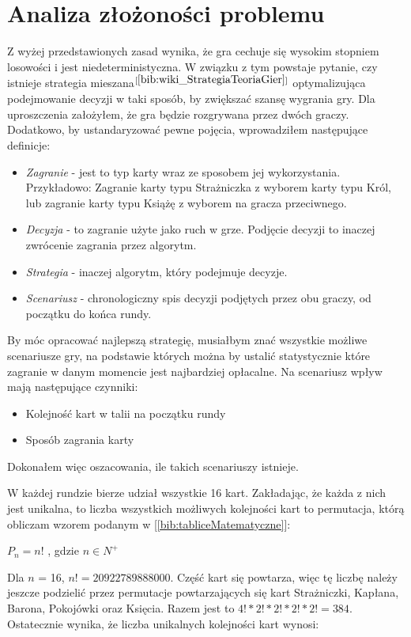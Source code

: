 \section{Analiza złożoności problemu}
\label{sec:opisProblemu}
Z wyżej przedstawionych zasad wynika, że gra cechuje się wysokim stopniem losowości i jest niedeterministyczna. W związku z tym powstaje pytanie, czy istnieje strategia mieszana$^{[\ref{bib:wiki_StrategiaTeoriaGier}]}$ optymalizująca podejmowanie decyzji w taki sposób, by zwiększać szansę wygrania gry. Dla uproszczenia założyłem, że gra będzie rozgrywana przez dwóch graczy. Dodatkowo, by ustandaryzować pewne pojęcia, wprowadziłem następujące definicje:
\begin{itemize}
	\item \textit{Zagranie} - jest to typ karty wraz ze sposobem jej wykorzystania. Przykładowo: Zagranie karty typu Strażniczka z wyborem karty typu Król, lub zagranie karty typu Książę z wyborem na gracza przeciwnego.
	\item \textit{Decyzja} - to zagranie użyte jako ruch w grze. Podjęcie decyzji to inaczej zwrócenie zagrania przez algorytm.
	\item \textit{Strategia} - inaczej algorytm, który podejmuje decyzje. 
	\item \textit{Scenariusz} - chronologiczny spis decyzji podjętych przez obu graczy, od początku do końca rundy.
\end{itemize}

By móc opracować najlepszą strategię, musiałbym znać wszystkie możliwe scenariusze gry, na podstawie których można by ustalić statystycznie które zagranie w danym momencie jest najbardziej opłacalne. Na scenariusz wpływ mają następujące czynniki:
\begin{itemize}
	\item Kolejność kart w talii na początku rundy
	\item Sposób zagrania karty
\end{itemize}
Dokonałem więc oszacowania, ile takich scenariuszy istnieje. 

W każdej rundzie bierze udział wszystkie 16 kart. Zakładając, że każda z nich jest unikalna, to  liczba wszystkich możliwych kolejności kart to permutacja, którą obliczam wzorem podanym w [\ref{bib:tabliceMatematyczne}]:

\begin{center}
	$P_n = n!$ , gdzie $n\in N^+$
\end{center}

Dla  $n$ = 16, $n!=20 922 789 888 000$. Część kart się powtarza, więc tę liczbę należy jeszcze podzielić przez permutacje powtarzających się kart Strażniczki, Kapłana, Barona, Pokojówki oraz Księcia. Razem jest to $4! * 2! * 2! * 2! * 2! =  384$. Ostatecznie wynika, że liczba unikalnych kolejności kart wynosi: 

